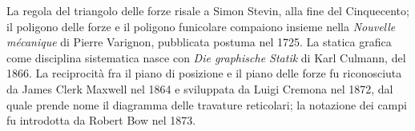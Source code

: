 \begin{oss}
	\label{oss:nota_storica_sgr}
	La regola del triangolo delle forze risale a Simon Stevin, alla fine del Cinquecento; il
	poligono delle forze e il poligono funicolare compaiono insieme nella \emph{Nouvelle mécanique}
	di Pierre Varignon, pubblicata postuma nel 1725. La statica grafica come disciplina sistematica
	nasce con \emph{Die graphische Statik} di Karl Culmann, del 1866. La reciprocità fra il piano di
	posizione e il piano delle forze fu riconosciuta da James Clerk Maxwell nel 1864 e sviluppata
	da Luigi Cremona nel 1872, dal quale prende nome il diagramma delle travature reticolari; la
	notazione dei campi fu introdotta da Robert Bow nel 1873.
\end{oss}

%
%
%
%
%
